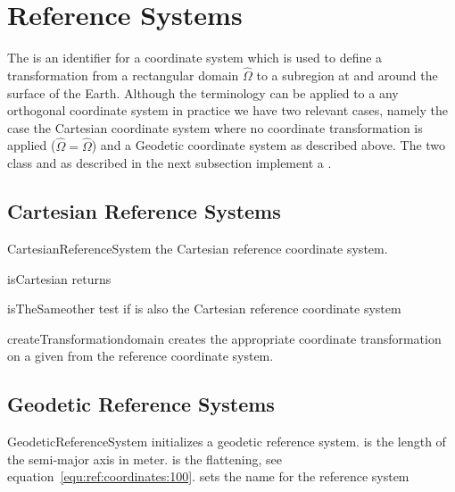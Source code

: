 \section{Reference Systems}\label{sec:ref:reference systems}
The  is an identifier for a coordinate system which is used to define a 
transformation from a rectangular domain $\widehat{\Omega}$ to a subregion at and around the surface of the Earth. 
Although the terminology can be applied to a any orthogonal coordinate system in practice
we have two relevant cases, namely the case the Cartesian coordinate system where no coordinate transformation
is applied ($\widehat{\Omega}= \widehat{\Omega}$) and a Geodetic coordinate system as described above. 
The two class  and  as described in the 
next subsection implement a .

\subsection{Cartesian Reference Systems}
\begin{classdesc}{CartesianReferenceSystem}{}
the Cartesian reference coordinate system.
\end{classdesc}

\begin{methoddesc}[GeodeticReferenceSystem]{isCartesian}{}
returns \True 
\end{methoddesc}


\begin{methoddesc}[CartesianReferenceSystem]{isTheSame}{other}
test if  is also the Cartesian reference coordinate system
\end{methoddesc}


\begin{methoddesc}[CartesianReferenceSystem]{createTransformation}{domain}
creates the appropriate coordinate transformation  on a given 
from the reference coordinate system.
\end{methoddesc}

\subsection{Geodetic Reference Systems}

\begin{classdesc}{GeodeticReferenceSystem}{
}
initializes a geodetic reference system. 
 is the length of the semi-major axis in meter.
 is the flattening, see equation~\ref{equ:ref:coordinates:100}.  
 sets the name for the reference system 
\end{classdesc}


